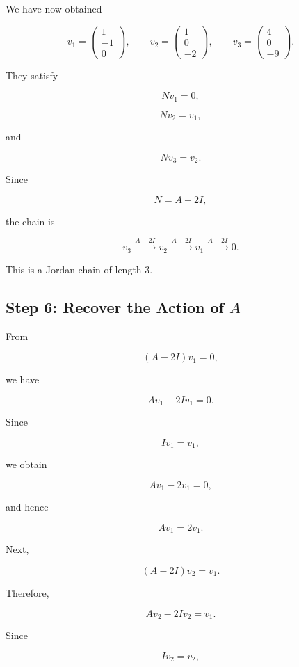 \documentclass[11pt]{article}
\begin{document}
We have now obtained

\[
v_1=
\begin{pmatrix}
1\\
-1\\
0
\end{pmatrix},
\qquad
v_2=
\begin{pmatrix}
1\\
0\\
-2
\end{pmatrix},
\qquad
v_3=
\begin{pmatrix}
4\\
0\\
-9
\end{pmatrix}.
\]

They satisfy

\[
Nv_1=0,
\]

\[
Nv_2=v_1,
\]

and

\[
Nv_3=v_2.
\]

Since

\[
N=A-2I,
\]

the chain is

\[
\boxed{
v_3
\xrightarrow{\,A-2I\,}
v_2
\xrightarrow{\,A-2I\,}
v_1
\xrightarrow{\,A-2I\,}
0.
}
\]

This is a Jordan chain of length \(3\).


\subsection{Step 6: Recover the Action of \(A\)}

From

\[
(A-2I)v_1=0,
\]

we have

\[
Av_1-2Iv_1=0.
\]

Since

\[
Iv_1=v_1,
\]

we obtain

\[
Av_1-2v_1=0,
\]

and hence

\[
\boxed{
Av_1=2v_1.
}
\]

Next,

\[
(A-2I)v_2=v_1.
\]

Therefore,

\[
Av_2-2Iv_2=v_1.
\]

Since

\[
Iv_2=v_2,
\]
\end{document}
